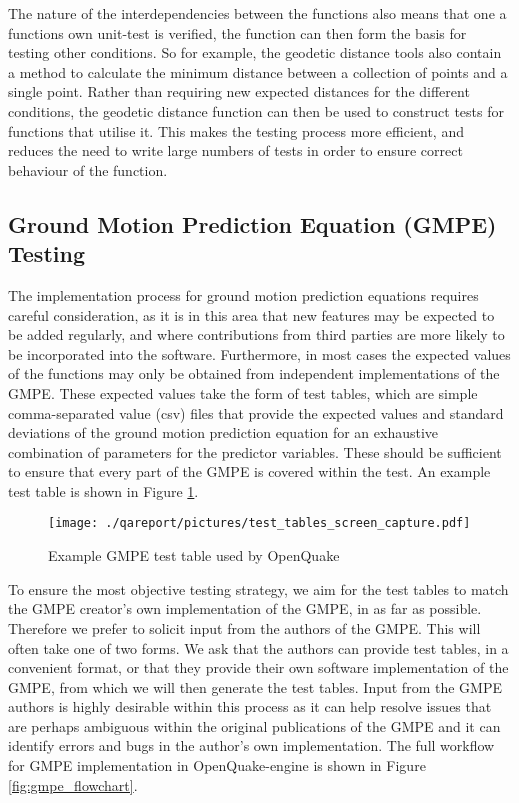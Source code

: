 The nature of the interdependencies between the functions also means that one a
functions own unit-test is verified, the function can then form the basis for
testing other conditions. So for example, the geodetic distance tools also
contain a method to calculate the minimum distance between a collection of
points and a single point. Rather than requiring new expected distances for the
different conditions, the geodetic distance function can then be used to
construct tests for functions that utilise it. This makes the testing process
more efficient, and reduces the need to write large numbers of tests in order to
ensure correct behaviour of the function.
%
\subsection{Ground Motion Prediction Equation (GMPE) Testing}
The implementation process for ground motion prediction equations requires
careful consideration, as it is in this area that new features may be expected
to be added regularly, and where contributions from third parties are more
likely to be incorporated into the software. Furthermore, in most cases the
expected values of the functions may only be obtained from independent
implementations of the GMPE. These expected values take the form of test tables,
which are simple comma-separated value (csv) files that provide the expected
values and standard deviations of the ground motion prediction equation for an
exhaustive combination of parameters for the predictor variables. These should
be sufficient to ensure that every part of the GMPE is covered within the test.
An example test table is shown in Figure \ref{fig:gmpe_test_table}.
%
\begin{figure}[htbp]
  \centering
  \texttt{[image: ./qareport/pictures/test\_tables\_screen\_capture.pdf]}
  \caption{Example GMPE test table used by OpenQuake}
  \label{fig:gmpe_test_table}
\end{figure}

To ensure the most objective testing strategy, we aim for the test tables 
to match the GMPE creator's own implementation of the GMPE, in as far as 
possible. Therefore we prefer to solicit input from the authors of the GMPE. 
This will often take one of two forms. We ask that the authors can provide 
test tables, in a convenient format, or that they provide their own software 
implementation of the GMPE, from which we will then generate the test tables.
Input from the GMPE authors is highly desirable within this process as it 
can help resolve issues that are perhaps ambiguous within the original
publications of the GMPE and it can identify errors and bugs in the 
author's own implementation. The full workflow for GMPE implementation 
in OpenQuake-engine is shown in Figure \ref{fig:gmpe_flowchart}.

